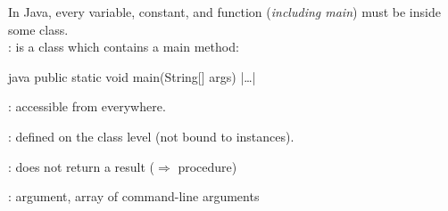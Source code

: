 \begin{sectionbox}\nospacing
  In Java, every variable, constant, and function (\textit{including main}) must
  be inside some class.\\
  : is a class which contains a main method:
  \begin{mintlinebox}{java}
		public static void main(String[] args) { |\ldots| }
  \end{mintlinebox}
  \begin{itemizenosep}
      \item {}: accessible from everywhere.
      \item {}: defined on the class level (not bound to instances).
      \item {}: does not return a result ($\Rightarrow$ procedure)
      \item {}: argument, array of command-line arguments
  \end{itemizenosep}
\end{sectionbox}
